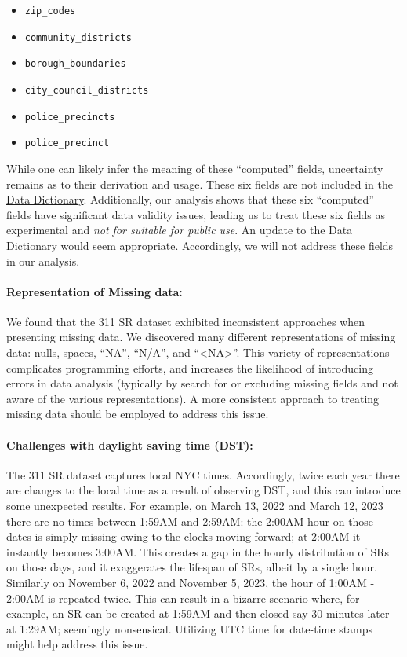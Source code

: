 \documentclass[linenumber]{jdsart}
\begin{document}
\begin{itemize}[left=1.5em]
    \item \texttt{zip\_codes}
    \item \texttt{community\_districts}
    \item \texttt{borough\_boundaries}
    \item \texttt{city\_council\_districts}
    \item \texttt{police\_precincts}
    \item \texttt{police\_precinct}
\end{itemize}

While one can likely infer the meaning of these ``computed'' 
fields, uncertainty remains as to their derivation and 
usage. These six fields are not included in
the \href{https://data.cityofnewyork.us/api/views/erm2-nwe9/files/b372b884-f86a-453b-ba16-1fe06ce9d212?download=true&filename=311_ServiceRequest_2010-Present_DataDictionary_Updated_2023.xlsx}{Data Dictionary}. Additionally, 
our analysis shows that these six ``computed'' fields have 
significant data validity issues, leading us to treat these six fields 
as experimental and \textit{not for suitable for public use}. An update 
to the Data Dictionary would seem appropriate. Accordingly, 
we will not address these fields in our analysis. 

\paragraph{Representation of Missing data:} We found that the 
311 SR dataset exhibited inconsistent approaches when 
presenting missing data. We discovered many different 
representations of missing data: nulls, spaces, ``NA'', ``N/A'', 
and ``<NA>''. This variety of representations complicates programming
efforts, and increases the likelihood of introducing errors 
in data analysis (typically by search for or excluding missing fields 
and not aware of the various representations). A more consistent 
approach to treating missing data should be employed to address this issue.

\paragraph{Challenges with daylight saving time (DST):} The 311 SR 
dataset captures local NYC times. Accordingly, twice each 
year there are changes to the local time as a result of observing 
DST, and this can introduce some unexpected results. For example, 
on March 13, 2022 and March 12, 2023 there are no times 
between 1:59AM and 2:59AM: the 2:00AM hour on those dates 
is simply missing owing to the clocks moving forward; at 2:00AM 
it instantly becomes 3:00AM. This creates a gap in the hourly 
distribution of SRs on those days, and it exaggerates the 
lifespan of SRs, albeit by a single hour. Similarly on 
November 6, 2022 and November 5, 2023, the 
hour of 1:00AM - 2:00AM is repeated twice. This can result 
in a bizarre scenario where, for example, an SR can 
be created at 1:59AM and then closed say 30 minutes later 
at 1:29AM; seemingly nonsensical. Utilizing UTC time 
for date\mbox{-}time stamps might help address this issue.
\end{document}
